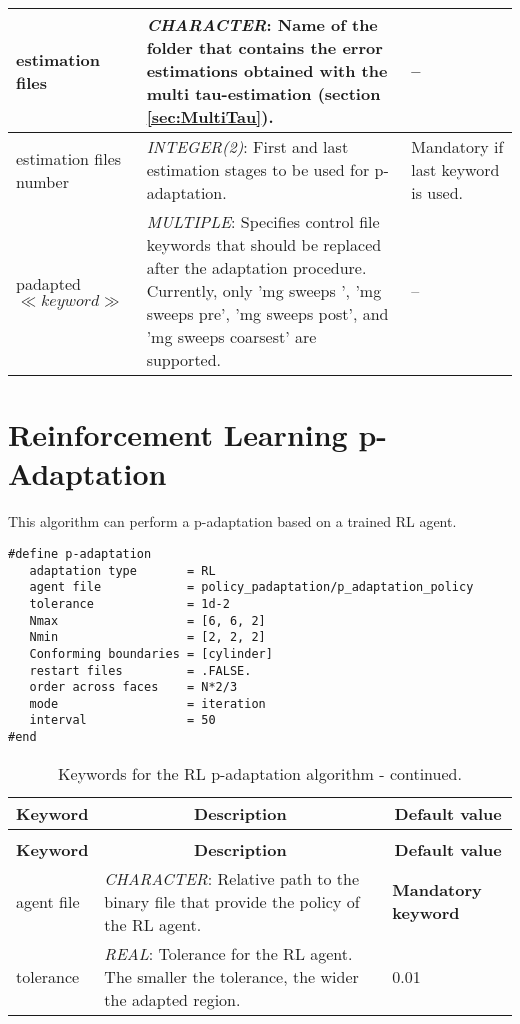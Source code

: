 \documentclass[a4paper,10pt]{report}
\begin{document}
\begin{longtable}{|p{4cm}|p{10cm}|p{2.2cm}|}
estimation files &
			\textit{CHARACTER}: Name of the folder that contains the error estimations obtained with the multi tau-estimation (section \ref{sec:MultiTau}). &
					-- \\ \hline

estimation files number &
			\textit{INTEGER(2)}: First and last estimation stages to be used for p-adaptation. &
					Mandatory if last keyword is used. \\ \hline

padapted $\ll \textit{keyword} \gg$ &
			\textit{MULTIPLE}: Specifies control file keywords that should be replaced after the adaptation procedure. Currently, only 'mg sweeps         ', 'mg sweeps pre', 'mg sweeps post', and 'mg sweeps coarsest' are supported. &
					-- \\ \hline

\end{longtable}

\section{Reinforcement Learning p-Adaptation}
This algorithm can perform a p-adaptation based on a trained RL agent.

\begin{lstlisting}
#define p-adaptation
   adaptation type       = RL
   agent file            = policy_padaptation/p_adaptation_policy
   tolerance             = 1d-2
   Nmax                  = [6, 6, 2]
   Nmin                  = [2, 2, 2]
   Conforming boundaries = [cylinder]
   restart files         = .FALSE.
   order across faces    = N*2/3
   mode                  = iteration
   interval              = 50
#end
\end{lstlisting}

\begin{longtable}{|p{4cm}|p{10cm}|p{2.2cm}|}
\caption{Keywords for the RL p-adaptation algorithm.} \label{tab:RLpAdaptationKey} \\
\hline
\multicolumn{1}{|c|}{\textbf{Keyword}} & \multicolumn{1}{c|}{\textbf{Description}} & \multicolumn{1}{c|}{\textbf{Default value}} \\ \hline
\endfirsthead

\caption{Keywords for the RL p-adaptation algorithm - continued.} \\
\hline
\multicolumn{1}{|c|}{\textbf{Keyword}} & \multicolumn{1}{c|}{\textbf{Description}} & \multicolumn{1}{c|}{\textbf{Default value}} \\ \hline
\endhead

agent file & \textit{CHARACTER}: Relative path to the binary file that provide the policy of the RL agent. & \textbf{Mandatory keyword} \\ \hline

tolerance & \textit{REAL}: Tolerance for the RL agent. The smaller the tolerance, the wider the adapted region. & 0.01 \\ \hline


\end{longtable}
\end{document}

